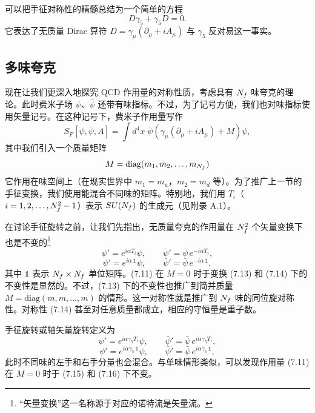 可以把手征对称性的精髓总结为一个简单的方程
\begin{equation}
  D\gamma_5 + \gamma_5 D = 0 .
\end{equation}
它表达了无质量 Dirac 算符 $D = \gamma_\mu(\partial_\mu + iA_\mu)$ 与 $\gamma_5$ 反对易这一事实。

\subsection{多味夸克}

现在让我们更深入地探究 QCD 作用量的对称性质，考虑具有 $N_f$ 味夸克的理论。此时费米子场 $\psi$、$\bar\psi$ 还带有味指标。不过，为了记号方便，我们也对味指标使用矢量记号。在这种记号下，费米子作用量写作
\begin{equation}
  S_F[\psi,\bar\psi,A] = \int d^4x\;\bar\psi\left(\gamma_\mu(\partial_\mu + iA_\mu) + M\right)\psi,
\end{equation}
其中我们引入一个质量矩阵
\begin{equation}
  M = \mathrm{diag}(m_1, m_2, \ldots, m_{N_f})
\end{equation}
它作用在味空间上（在现实世界中 $m_1 = m_u$，$m_2 = m_d$ 等）。为了推广上一节的手征变换，我们使用能混合不同味的矩阵。特别地，我们用 $T_i$（$i = 1, 2, \ldots, N_f^2 - 1$）表示 $SU(N_f)$ 的生成元（见附录 A.1）。

在讨论手征旋转之前，让我们先指出，无质量夸克的作用量在 $N_f^2$ 个矢量变换下也是不变的\footnote{``矢量变换''这一名称源于对应的诺特流是矢量流。}
\begin{equation}
  \psi' = e^{i\alpha T_i}\psi,
  \qquad
  \bar\psi' = \bar\psi\,e^{-i\alpha T_i},
\end{equation}
\begin{equation}
  \psi' = e^{i\alpha\,\mathbb{1}}\psi,
  \qquad
  \bar\psi' = \bar\psi\,e^{-i\alpha\,\mathbb{1}},
\end{equation}
其中 $\mathbb{1}$ 表示 $N_f \times N_f$ 单位矩阵。(7.11) 在 $M = 0$ 时于变换 (7.13) 和 (7.14) 下的不变性是显然的。不过，(7.13) 下的不变性也推广到简并质量 $M = \mathrm{diag}(m, m, \ldots, m)$ 的情形。这一对称性就是推广到 $N_f$ 味的同位旋对称性。对称性 (7.14) 甚至对任意质量都成立，相应的守恒量是重子数。

手征旋转或轴矢量旋转定义为
\begin{equation}
  \psi' = e^{i\alpha\gamma_5 T_i}\psi,
  \qquad
  \bar\psi' = \bar\psi\,e^{i\alpha\gamma_5 T_i},
\end{equation}
\begin{equation}
  \psi' = e^{i\alpha\gamma_5\,\mathbb{1}}\psi,
  \qquad
  \bar\psi' = \bar\psi\,e^{i\alpha\gamma_5\,\mathbb{1}},
\end{equation}
此时不同味的左手和右手分量也会混合。与单味情形类似，可以发现作用量 (7.11) 在 $M = 0$ 时于 (7.15) 和 (7.16) 下不变。

